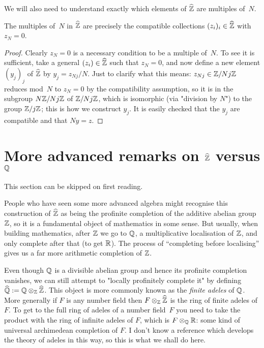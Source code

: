 We will also need to understand exactly which elements of $\widehat{\mathbb{Z}}$
are multiples of~$N$.

\begin{lemma}
    \label{ZHat.multiples}
    \leanok
    The multiples of~$N$ in $\widehat{\mathbb{Z}}$ are precisely the compatible collections $(z_i)_i\in\widehat{\mathbb{Z}}$ 
    with $z_N=0$.
\end{lemma}
\begin{proof} \leanok
    Clearly $z_N=0$ is a necessary condition to be a multiple of~$N$. To see it is sufficient, 
    take a general $(z_i)\in\widehat{\mathbb{Z}}$ such that $z_N=0$, 
    and now define a new element $(y_j)_j$ of $\widehat{\mathbb{Z}}$
    by $y_j=z_{Nj}/N$. Just to clarify what this means: $z_{Nj}\in\mathbb{Z}/Nj\mathbb{Z}$ reduces mod~$N$ 
    to $z_N=0$ by the compatibility assumption, so it is in the subgroup $N\mathbb{Z}/Nj\mathbb{Z}$ of $\mathbb{Z}/Nj\mathbb{Z}$, 
    which is isomorphic (via "division by $N$") to the group $\mathbb{Z}/j\mathbb{Z}$; this is how we construct 
    $y_j$. It is easily checked that the $y_j$ are compatible and that $Ny=z$.
\end{proof}

\section{More advanced remarks on \texorpdfstring{$\widehat{\mathbb{Z}}$}{Zhat} versus \texorpdfstring{$\mathbb{Q}$}{Q}}

This section can be skipped on first reading.

People who have seen some more advanced algebra might recognise this construction of $\widehat{\mathbb{Z}}$
as being the profinite completion of the additive abelian group $\mathbb{Z}$, so it is a fundamental
object of mathematics in some sense. But usually, when building mathematics, after $\mathbb{Z}$ we 
go to $\mathbb{Q}$, a multiplicative localisation of $\mathbb{Z}$, and only complete after that (to get $\mathbb{R}$).
The process of ``completing before localising'' gives us a far more arithmetic completion
of $\mathbb{Z}$.

Even though $\mathbb{Q}$ is a divisible abelian group and hence its profinite completion vanishes,
we can still attempt to "locally profinitely complete it" by defining $\widehat{\mathbb{Q}}:=\mathbb{Q}\otimes_{\mathbb{Z}}\widehat{\mathbb{Z}}$. 
This object is more commonly known as the \emph{finite adeles} of $\mathbb{Q}$. More generally if $F$ is
any number field then $F\otimes_{\mathbb{Z}}\widehat{\mathbb{Z}}$ is the ring of finite adeles of $F$. To get to
the full ring of adeles of a number field~$F$ you need to take the product with the
ring of infinite adeles of $F$, which is $F\otimes_{\mathbb{Q}}\mathbb{R}$: some kind of universal
archimedean completion of $F$. I don't know a reference which develops the theory of adeles
in this way, so this is what we shall do here.

